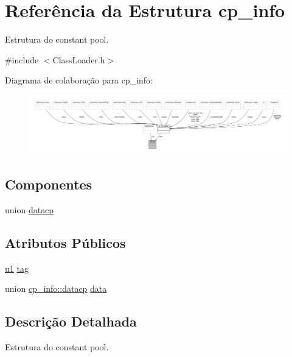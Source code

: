 \hypertarget{structcp__info}{}\section{Referência da Estrutura cp\+\_\+info}
\label{structcp__info}


Estrutura do constant pool.  




{\ttfamily \#include $<$Class\+Loader.\+h$>$}



Diagrama de colaboração para cp\+\_\+info\+:
\nopagebreak
\begin{figure}[H]
\begin{center}
\leavevmode
\includegraphics[width=350pt]{structcp__info__coll__graph}
\end{center}
\end{figure}
\subsection*{Componentes}
\begin{DoxyCompactItemize}
\item 
union \hyperlink{unioncp__info_1_1datacp}{datacp}
\end{DoxyCompactItemize}
\subsection*{Atributos Públicos}
\begin{DoxyCompactItemize}
\item 
\hyperlink{ClassLoader_8h_a216a9f8b04b4f0af84a4ca9d1d85a6ca}{u1} \hyperlink{structcp__info_a045b8801a6e96a2a31d3b62ea684f141}{tag}
\item 
union \hyperlink{unioncp__info_1_1datacp}{cp\+\_\+info\+::datacp} \hyperlink{structcp__info_a1c63f47410d9a935cfe2ce56075957cb}{data}
\end{DoxyCompactItemize}


\subsection{Descrição Detalhada}
Estrutura do constant pool. 


